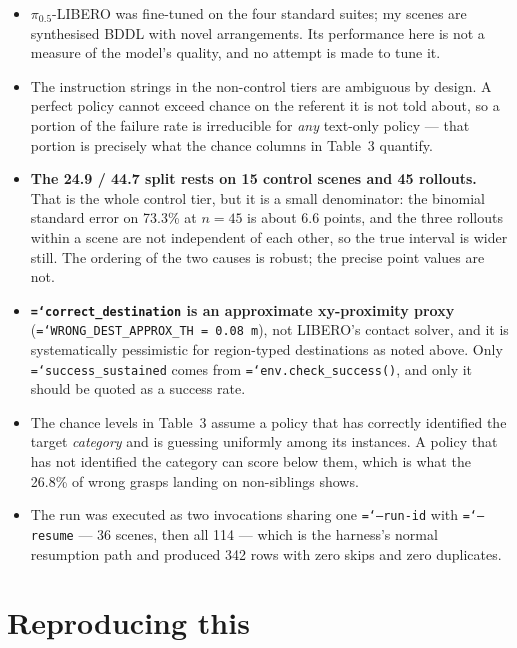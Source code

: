 \documentclass[11pt,a4paper]{article}
\newcommand{\code}[1]{\texttt{\small\hyphenchar\font=`\-\relax #1}}
\begin{document}
\begin{itemize}
  \item $\pi_{0.5}$-LIBERO was fine-tuned on the four standard suites; my scenes
    are synthesised BDDL with novel arrangements. Its performance here is not a
    measure of the model's quality, and no attempt is made to tune it.
  \item The instruction strings in the non-control tiers are ambiguous by
    design. A perfect policy cannot exceed chance on the referent it is not told
    about, so a portion of the failure rate is irreducible for \emph{any}
    text-only policy --- that portion is precisely what the chance columns in
    Table~3 quantify.
  \item \textbf{The 24.9 / 44.7 split rests on 15 control scenes and 45
    rollouts.} That is the whole control tier, but it is a small denominator:
    the binomial standard error on 73.3\% at $n=45$ is about 6.6 points, and the
    three rollouts within a scene are not independent of each other, so the true
    interval is wider still. The ordering of the two causes is robust; the
    precise point values are not.
  \item \textbf{\code{correct\_destination} is an approximate xy-proximity
    proxy} (\code{WRONG\_DEST\_APPROX\_TH = 0.08\,m}), not LIBERO's contact
    solver, and it is systematically pessimistic for region-typed destinations
    as noted above. Only \code{success\_sustained} comes from
    \code{env.check\_success()}, and only it should be quoted as a success rate.
  \item The chance levels in Table~3 assume a policy that has correctly
    identified the target \emph{category} and is guessing uniformly among its
    instances. A policy that has not identified the category can score below
    them, which is what the 26.8\% of wrong grasps landing on non-siblings
    shows.
  \item The run was executed as two invocations sharing one \code{--run-id} with
    \code{--resume} --- 36 scenes, then all 114 --- which is the harness's
    normal resumption path and produced 342 rows with zero skips and zero
    duplicates.
\end{itemize}

\section{Reproducing this}
\end{document}
